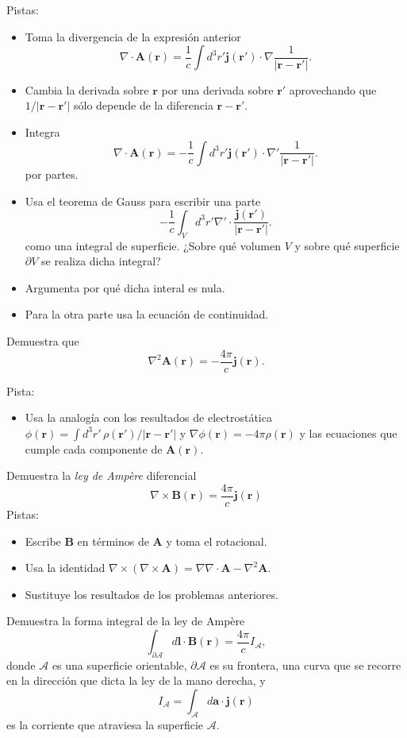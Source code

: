 \documentclass{exam}
\begin{document}
\begin{questions}
    Pistas:
    \begin{itemize}
    \item Toma la divergencia de la expresión anterior
      $$ \nabla\cdot\bm A(\bm r)=\frac{1}{c}\int d^3r' \bm j(\bm r')\cdot\nabla\frac{1}{|\bm
        r-\bm r'|}.
      $$
    \item Cambia la derivada sobre $\bm r$ por una derivada sobre $\bm
      r'$ aprovechando que $1/|\bm r-\bm r'|$ sólo depende de la
      diferencia $\bm r-\bm r'$.
    \item Integra
      $$ \nabla\cdot\bm A(\bm r)=-\frac{1}{c}\int d^3r' \bm j(\bm
        r')\cdot\nabla'\frac{1}{|\bm r-\bm r'|}.
      $$
      por partes.
    \item Usa el teorema de Gauss para escribir una parte
      $$-\frac{1}{c}\int_V d^3r' \nabla'\cdot \frac{\bm j(\bm
        r')}{|\bm r-\bm r'|}.
      $$
      como una integral de superficie. ¿Sobre qué volumen $V$ y sobre
      qué superficie $\partial V$ se realiza dicha integral?
    \item Argumenta por qué dicha interal es nula.
    \item Para la otra parte usa la ecuación de continuidad.
    \end{itemize}
  \question Demuestra que
    $$\nabla^2\bm A(\bm r)=-\frac{4\pi}{c}\bm j(\bm r).$$

    Pista:
    \begin{itemize}
    \item Usa la analogía con los resultados de electrostática
      $\phi(\bm r)=\int d^3r'\,\rho(\bm r')/|\bm r-\bm r'|$ y
      $\nabla\phi(\bm r)=-4\pi\rho(\bm r)$ y las ecuaciones que cumple
      cada componente de $\bm A(\bm r)$.
    \end{itemize}
  \question Demuestra la {\em ley de Ampère} diferencial
    $$\nabla\times\bm B(\bm r)=\frac{4\pi}{c}\bm j(\bm r)$$
    Pistas:
    \begin{itemize}
    \item Escribe $\bm B$ en términos de $\bm A$ y toma el rotacional.
    \item Usa la identidad $\nabla\times(\nabla\times \bm
      A)=\nabla\nabla\cdot\bm A-\nabla^2\bm A$.
    \item Sustituye los resultados de los problemas anteriores.
    \end{itemize}
  \question Demuestra la forma integral de la ley de Ampère
    $$
    \int_{\partial \mathcal A} d\bm l\cdot\bm B(\bm
    r)=\frac{4\pi}{c}I_{\mathcal A},
    $$
    donde $\mathcal A$ es una superficie orientable, $\partial
    \mathcal A$ es su frontera, una curva que se recorre en la
    dirección que dicta la ley de la mano derecha, y
    $$
    I_{\mathcal A}=\int_{\mathcal A}d\bm a\cdot\bm j(\bm r)
    $$
    es la corriente que atraviesa la superficie $\mathcal A$.


\end{questions}
\end{document}
